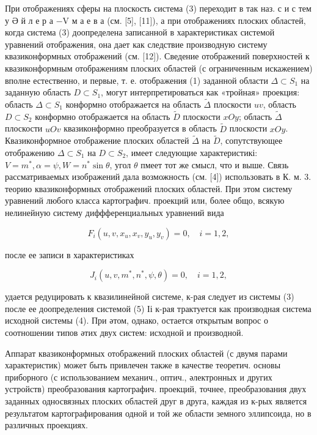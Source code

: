 \documentclass[10pt]{article}
\begin{document}
При отображениях сферы на плоскость система (3) переходит в так наз. с и с тем у Ә й л е р а $-\mathrm{V}$ м а е в а (см. [5], [11]), а при отображениях плоских областей, когда система (3) доопределена записанной в характеристиках системой уравнений отображения, она дает как следствие производную систему квазиконформных отображений (см. [12]). Сведение отображений поверхностей к квазиконформным отображениям плоских областей (с ограниченным искажением) вполне естественно, и первые, т. е. отображения (1) заданной области $\Delta \subset S_{1}$ на заданную область $D \subset S_{1}$, могут интерпретироваться как «тройная» проекция: область $\Delta \subset S_{1}$ конформно отображается на область $\tilde{\Delta}$ плоскости $u v$, область $D \subset S_{2}$ конформно отображается на область $\tilde{D}$ плоскости $x O y$; область $\tilde{\Delta}$ плоскости $u O v$ квазиконформно преобразуется в область $\tilde{D}$ плоскости $x O y$. Квазиконформное отображение плоских областей $\tilde{\Delta}$ на $\tilde{D}$, сопутствующее отображению $\Delta \subset S_{1}$ на $D \subset S_{2}$, имеет следующие характеристикі: $V=m^{*}, \alpha=\psi, W=n^{*} \sin \theta$, угол $\theta$ пмеет тот же смысл, что и выше. Связь рассматриваемых изображений дала возможность (см. [4]) использовать в К. м. 3. теорию квазиконформных отображений плоских областей. При этом систему уравнений любого класса картографич. проекций или, более общо, всякую нелинейную систему диффференциальных уравнений вида



\[

F_{i}\left(u, v, x_{u}, x_{v}, y_{u}, y_{v}\right)=0, \quad i=1,2,

\]



после ее записи в характеристиках



\[

J_{i}\left(u, v, m^{*}, n^{*}, \psi, \theta\right)=0, \quad i=1,2,

\]



удается редуцировать к квазилинейной системе, к-рая следует из системы (3) после ее доопределения системой (5) Іі к-рая трактуется как производная система исходной системы (4). При әтом, однако, остается открытым вопрос о соотношении типов әтих двух систем: исходной и производной.



Аппарат квазиконформных отображений плоских областей (с двумя парами характеристик) может быть привлечен также в качестве теоретич. основы приборного (с использованием механич., оптич., әлектронных и других устройств) преобразования картографич. проекций, точнее, преобразования двух заданных односвязных плоских областей друг в друга, каждая из к-рых является результатом картографирования одной и той же области земного эллипсоида, но в различных проекциях.
\end{document}
